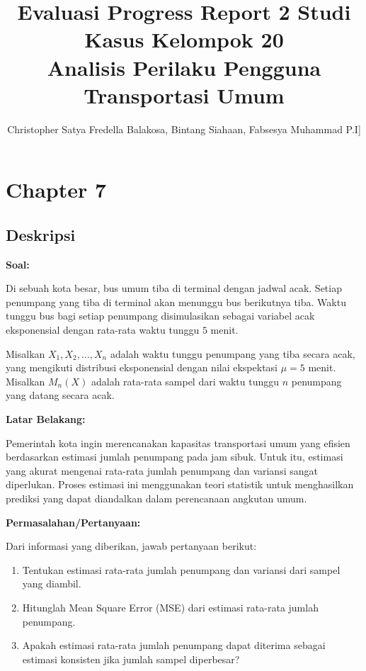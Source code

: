 \documentclass{article}
\begin{document}
\title{\textbf{Evaluasi Progress Report 2 Studi Kasus Kelompok 20} \\ Analisis Perilaku Pengguna Transportasi Umum}
\author{Christopher Satya Fredella Balakosa, Bintang Siahaan, Fabsesya Muhammad P.I]}
\date{}
\maketitle

\section{Chapter 7}
\subsection{Deskripsi}
\textbf{Soal:}

Di sebuah kota besar, bus umum tiba di terminal dengan jadwal acak. Setiap penumpang yang tiba di terminal akan menunggu bus berikutnya tiba. Waktu tunggu bus bagi setiap penumpang disimulasikan sebagai variabel acak eksponensial dengan rata-rata waktu tunggu \( 5 \) menit.

Misalkan \( X_1, X_2, \dots, X_n \) adalah waktu tunggu penumpang yang tiba secara acak, yang mengikuti distribusi eksponensial dengan nilai ekspektasi \( \mu = 5 \) menit. Misalkan \( M_n(X) \) adalah rata-rata sampel dari waktu tunggu \( n \) penumpang yang datang secara acak.

\textbf{Latar Belakang:}

Pemerintah kota ingin merencanakan kapasitas transportasi umum yang efisien berdasarkan estimasi jumlah penumpang pada jam sibuk. Untuk itu, estimasi yang akurat mengenai rata-rata jumlah penumpang dan variansi sangat diperlukan. Proses estimasi ini menggunakan teori statistik untuk menghasilkan prediksi yang dapat diandalkan dalam perencanaan angkutan umum.

\textbf{Permasalahan/Pertanyaan:}

Dari informasi yang diberikan, jawab pertanyaan berikut:
\begin{enumerate}
    \item Tentukan estimasi rata-rata jumlah penumpang dan variansi dari sampel yang diambil.
    \item Hitunglah Mean Square Error (MSE) dari estimasi rata-rata jumlah penumpang.
    \item Apakah estimasi rata-rata jumlah penumpang dapat diterima sebagai estimasi konsisten jika jumlah sampel diperbesar?
\end{enumerate}
\end{document}
